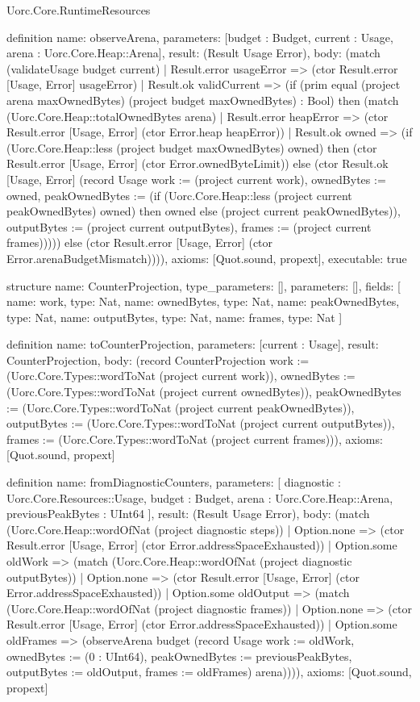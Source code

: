 \begin{lexlean}{Uorc.Core.RuntimeResources}
\begin{semanticmodule}
definition{
  name: observeArena,
  parameters: [budget : Budget, current : Usage, arena : Uorc.Core.Heap::Arena],
  result: (Result Usage Error),
  body: (match (validateUsage budget current)
    | Result.error usageError => (ctor Result.error [Usage, Error] usageError)
    | Result.ok validCurrent => (if (prim equal (project arena maxOwnedBytes) (project budget maxOwnedBytes) : Bool) then (match (Uorc.Core.Heap::totalOwnedBytes arena)
      | Result.error heapError => (ctor Result.error [Usage, Error] (ctor Error.heap heapError))
      | Result.ok owned => (if (Uorc.Core.Heap::less (project budget maxOwnedBytes) owned) then (ctor Result.error [Usage, Error] (ctor Error.ownedByteLimit)) else (ctor Result.ok [Usage, Error] (record Usage {work := (project current work), ownedBytes := owned, peakOwnedBytes := (if (Uorc.Core.Heap::less (project current peakOwnedBytes) owned) then owned else (project current peakOwnedBytes)), outputBytes := (project current outputBytes), frames := (project current frames)})))) else (ctor Result.error [Usage, Error] (ctor Error.arenaBudgetMismatch)))),
  axioms: [Quot.sound, propext],
  executable: true
}

structure{
  name: CounterProjection,
  type_parameters: [],
  parameters: [],
  fields: [
    {name: work, type: Nat},
    {name: ownedBytes, type: Nat},
    {name: peakOwnedBytes, type: Nat},
    {name: outputBytes, type: Nat},
    {name: frames, type: Nat}
  ]
}

definition{
  name: toCounterProjection,
  parameters: [current : Usage],
  result: CounterProjection,
  body: (record CounterProjection {work := (Uorc.Core.Types::wordToNat (project current work)), ownedBytes := (Uorc.Core.Types::wordToNat (project current ownedBytes)), peakOwnedBytes := (Uorc.Core.Types::wordToNat (project current peakOwnedBytes)), outputBytes := (Uorc.Core.Types::wordToNat (project current outputBytes)), frames := (Uorc.Core.Types::wordToNat (project current frames))}),
  axioms: [Quot.sound, propext]
}

definition{
  name: fromDiagnosticCounters,
  parameters: [
    diagnostic : Uorc.Core.Resources::Usage,
    budget : Budget,
    arena : Uorc.Core.Heap::Arena,
    previousPeakBytes : UInt64
  ],
  result: (Result Usage Error),
  body: (match (Uorc.Core.Heap::wordOfNat (project diagnostic steps))
    | Option.none => (ctor Result.error [Usage, Error] (ctor Error.addressSpaceExhausted))
    | Option.some oldWork => (match (Uorc.Core.Heap::wordOfNat (project diagnostic outputBytes))
      | Option.none => (ctor Result.error [Usage, Error] (ctor Error.addressSpaceExhausted))
      | Option.some oldOutput => (match (Uorc.Core.Heap::wordOfNat (project diagnostic frames))
        | Option.none => (ctor Result.error [Usage, Error] (ctor Error.addressSpaceExhausted))
        | Option.some oldFrames => (observeArena budget (record Usage {work := oldWork, ownedBytes := (0 : UInt64), peakOwnedBytes := previousPeakBytes, outputBytes := oldOutput, frames := oldFrames}) arena)))),
  axioms: [Quot.sound, propext]
}
\end{semanticmodule}
\end{lexlean}

